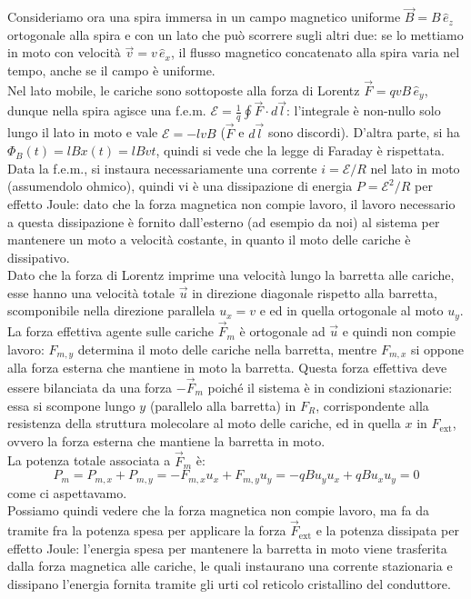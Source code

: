 \documentclass[]{article}
\newcommand{\E}{\mathcal{E}}
\begin{document}
Consideriamo ora una spira immersa in un campo magnetico uniforme $ \vec{B} = B \,\hat{e}_z $ ortogonale alla spira e con un lato che può scorrere sugli altri due: se lo mettiamo in moto con velocità $ \vec{v} = v \,\hat{e}_x $, il flusso magnetico concatenato alla spira varia nel tempo, anche se il campo è uniforme. \\ 
%
Nel lato mobile, le cariche sono sottoposte alla forza di Lorentz $ \vec{F} = qvB \,\hat{e}_y $, dunque nella spira agisce una f.e.m. $ \E = \frac{1}{q} \oint \vec{F}\cdot d\vec{l} $: l'integrale è non-nullo solo lungo il lato in moto e vale $ \E = -lvB $ ($ \vec{F} $ e $ d\vec{l} $ sono discordi). D'altra parte, si ha $ \Phi_B(t) = lB x(t) = lB v t $, quindi si vede che la legge di Faraday è rispettata. \\ 
%
Data la f.e.m., si instaura necessariamente una corrente $ i = \E / R $ nel lato in moto (assumendolo ohmico), quindi vi è una dissipazione di energia $ P = \E^2 / R $ per effetto Joule: dato che la forza magnetica non compie lavoro, il lavoro necessario a questa dissipazione è fornito dall'esterno (ad esempio da noi) al sistema per mantenere un moto a velocità costante, in quanto il moto delle cariche è dissipativo. \\ 
%
Dato che la forza di Lorentz imprime una velocità lungo la barretta alle cariche, esse hanno una velocità totale $ \vec{u} $ in direzione diagonale rispetto alla barretta, scomponibile nella direzione parallela $ u_x = v $ e ed in quella ortogonale al moto $ u_y $. La forza effettiva agente sulle cariche $ \vec{F}_m $ è ortogonale ad $ \vec{u} $ e quindi non compie lavoro: $ F_{m,y} $ determina il moto delle cariche nella barretta, mentre $ F_{m,x} $ si oppone alla forza esterna che mantiene in moto la barretta. Questa forza effettiva deve essere bilanciata da una forza $ -\vec{F}_m $ poiché il sistema è in condizioni stazionarie: essa si scompone lungo $ y $ (parallelo alla barretta) in $ F_R $, corrispondente alla resistenza della struttura molecolare al moto delle cariche, ed in quella $ x $ in $ F_{\text{ext}} $, ovvero la forza esterna che mantiene la barretta in moto. \\ 
%
La potenza totale associata a $ \vec{F}_m $  è:
\begin{equation}
	P_m = P_{m,x} + P_{m,y} = -F_{m,x}u_x + F_{m,y}u_y = -qBu_yu_x + qBu_xu_y = 0
	\label{eq:5}
\end{equation}
come ci aspettavamo. \\ 
%
Possiamo quindi vedere che la forza magnetica non compie lavoro, ma fa da tramite fra la potenza spesa per applicare la forza $ \vec{F}_{\text{ext}} $ e la potenza dissipata per effetto Joule: l'energia spesa per mantenere la barretta in moto viene trasferita dalla forza magnetica alle cariche, le quali instaurano una corrente stazionaria e dissipano l'energia fornita tramite gli urti col reticolo cristallino del conduttore.
\end{document}
